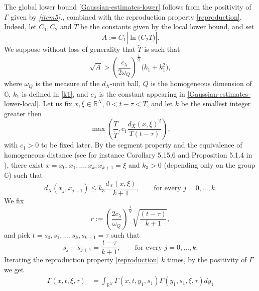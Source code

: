 \documentclass[11pt,a4paper]{article}
\numberwithin{equation}{section}
\def \rn {{\mathbb {R}}^{N}}
\def \GG {{\mathbb{G}}}
\def \G {{\Gamma}}
\def \l {{\lambda}}
\def \t {{\tau}}
\def \x {{\xi}}
\begin{document}
\begin{pf-fundamental}
	
	The global lower bound \eqref{Gaussian-estimates-lower} follows from the positivity of $\G$ given by \emph{\ref{item5}.}, combined with the reproduction property \eqref{reproduction}. Indeed, let $C_1,C_2$ and $\tilde{T}$ be the constants given by the local lower bound, and set
	\begin{equation}\label{chinotto-san-pellegrino-zero-zuccheri-aggiunti}
		A:=C_1 \left|\ln\Big(C_2 \tilde T\Big)\right|.
	\end{equation}
	We suppose without loss of generality that $\tilde{T}$ is such that
	\begin{equation}
		\sqrt{A}> \left(\frac{c_\l}{2\omega_Q}\right)^\frac{1}{Q} \Big(k_1+k_1^2\Big),
	\end{equation}	
	where $\omega_Q$ is the measure of the $d_X$-unit ball, $Q$ is the homogeneous dimension of $\GG$, $k_1$ is defined in \eqref{k1}, and $c_\l$ is the constant appearing in \eqref{Gaussian-estimates-lower-local}. Let us fix $x,\x \in \rn$, $0<t-\t<T$, and let $k$ be the smallest integer greater then
	\begin{equation}\label{def-k}
		\max\left(\frac{T}{\tilde T}, c_1 \frac{d_X(x,\x)^2}{T (t-\t)}\right),
	\end{equation}
	with $c_1>0$ to be fixed later. By the segment property and the equivalence of homogeneous distance (see for instance Corollary 5.15.6 and Proposition 5.1.4 	 in \cite{bonfiglioli2007stratified}), there exist $x=x_0	, x_1,\ldots,x_k,x_{k+1}=\x$ and $k_3>0$ (depending only on the group $\GG$) such that 
	\begin{equation}\label{segment}
		d_X(x_j,x_{j+1})\leq k_3 \frac{d_X(x,\x)}{k+1},\qquad \text{for every } j=0,\ldots,k.
	\end{equation}
	We fix
	\begin{equation}\label{VirginiaO}
		r:=\left(\frac{2c_\l}{\omega_Q}\right)^\frac{1}{Q}\sqrt{\frac{(t-\t)}{k+1}},
	\end{equation}
	and pick $t=s_0,s_1,\ldots,s_k,s_{k+1}=\t$ such that 
	\begin{equation}\label{fazio}
		s_j-s_{j+1}= \frac{t-\t}{k+1},\qquad \text{for every } j=0,\ldots,k.
	\end{equation}
	Iterating the reproduction property \eqref{reproduction} $k$ times, by the positivity of $\G$ we get
	\begin{equation}\label{grissini-conad}
		\begin{aligned}
			\G(x,t,\x,\t)&= \int_{\rn}\G(x,t,y_1,s_1)\G(y_1,s_1,\x,\t)dy_1 \\

\end{aligned}
\end{equation}
\end{pf-fundamental}
\end{document}
